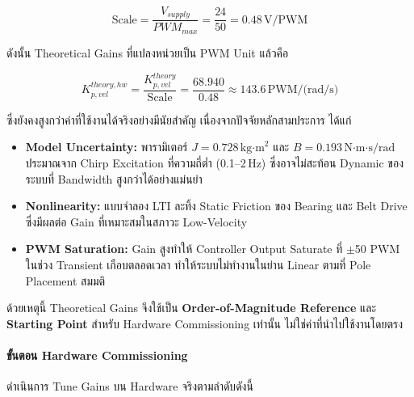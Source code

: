 \begin{equation}
    \text{Scale} = \frac{V_{supply}}{PWM_{max}}
                 = \frac{24}{50}
                 = 0.48\,\text{V/PWM}
    \label{eq:pwm_scale}
\end{equation}

ดังนั้น Theoretical Gains ที่แปลงหน่วยเป็น PWM Unit แล้วคือ

\begin{equation}
    K_{p,vel}^{theory,hw}
        = \frac{K_{p,vel}^{theory}}{\text{Scale}}
        = \frac{68.940}{0.48}
        \approx 143.6\,\text{PWM/(rad/s)}
    \label{eq:Kpv_scaled}
\end{equation}

ซึ่งยังคงสูงกว่าค่าที่ใช้งานได้จริงอย่างมีนัยสำคัญ
เนื่องจากปัจจัยหลักสามประการ ได้แก่

\begin{itemize}
    \item \textbf{Model Uncertainty:}
          พารามิเตอร์ $J = 0.728\,\text{kg·m}^2$ และ $B = 0.193\,\text{N·m·s/rad}$
          ประมาณจาก Chirp Excitation ที่ความถี่ต่ำ (0.1--2\,Hz)
          ซึ่งอาจไม่สะท้อน Dynamic ของระบบที่ Bandwidth สูงกว่าได้อย่างแม่นยำ

    \item \textbf{Nonlinearity:}
          แบบจำลอง LTI ละทิ้ง Static Friction ของ Bearing และ Belt Drive
          ซึ่งมีผลต่อ Gain ที่เหมาะสมในสภาวะ Low-Velocity

    \item \textbf{PWM Saturation:}
          Gain สูงทำให้ Controller Output Saturate ที่ $\pm$50 PWM
          ในช่วง Transient เกือบตลอดเวลา
          ทำให้ระบบไม่ทำงานในย่าน Linear ตามที่ Pole Placement สมมติ
\end{itemize}

ด้วยเหตุนี้ Theoretical Gains จึงใช้เป็น \textbf{Order-of-Magnitude Reference}
และ \textbf{Starting Point} สำหรับ Hardware Commissioning เท่านั้น
ไม่ใช่ค่าที่นำไปใช้งานโดยตรง

\paragraph{ขั้นตอน Hardware Commissioning}

ดำเนินการ Tune Gains บน Hardware จริงตามลำดับดังนี้

